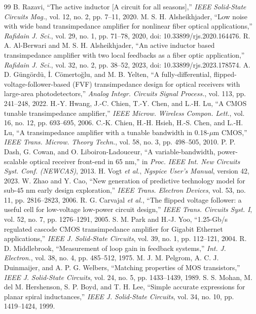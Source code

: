 \documentclass[11pt,a4paper]{article}
\begin{document}
\begin{thebibliography}{99}
 B. Razavi, ``The active inductor [A circuit for all seasons],'' \emph{IEEE Solid-State Circuits Mag.}, vol. 12, no. 2, pp. 7--11, 2020.
 M. S. H. Alsheikhjader, ``Low noise with wide band transimpedance amplifier for nonlinear fiber optical applications,'' \emph{Rafidain J. Sci.}, vol. 29, no. 1, pp. 71--78, 2020, doi: 10.33899/rjs.2020.164476.
 R. A. Al-Berwari and M. S. H. Alsheikhjader, ``An active inductor based transimpedance amplifier with two local feedbacks as a fiber optic application,'' \emph{Rafidain J. Sci.}, vol. 32, no. 2, pp. 38--52, 2023, doi: 10.33899/rjs.2023.178574.
 A. D. G\"ung\"ord\"u, \.I. C\"omerto\u{g}lu, and M. B. Yelten, ``A fully-differential, flipped-voltage-follower-based (FVF) transimpedance design for optical receivers with large-area photodetectors,'' \emph{Analog Integr. Circuits Signal Process.}, vol. 113, pp. 241--248, 2022.
 H.-Y. Hwang, J.-C. Chien, T.-Y. Chen, and L.-H. Lu, ``A CMOS tunable transimpedance amplifier,'' \emph{IEEE Microw. Wireless Compon. Lett.}, vol. 16, no. 12, pp. 693--695, 2006.
 C.-K. Chien, H.-H. Hsieh, H.-S. Chen, and L.-H. Lu, ``A transimpedance amplifier with a tunable bandwidth in 0.18-$\mu$m CMOS,'' \emph{IEEE Trans. Microw. Theory Techn.}, vol. 58, no. 3, pp. 498--505, 2010.
 P. P. Dash, G. Cowan, and O. Liboiron-Ladouceur, ``A variable-bandwidth, power-scalable optical receiver front-end in 65 nm,'' in \emph{Proc. IEEE Int. New Circuits Syst. Conf. (NEWCAS)}, 2013.
 H. Vogt \emph{et al.}, \emph{Ngspice User's Manual}, version 42, 2023.
 W. Zhao and Y. Cao, ``New generation of predictive technology model for sub-45 nm early design exploration,'' \emph{IEEE Trans. Electron Devices}, vol. 53, no. 11, pp. 2816--2823, 2006.
 R. G. Carvajal \emph{et al.}, ``The flipped voltage follower: a useful cell for low-voltage low-power circuit design,'' \emph{IEEE Trans. Circuits Syst. I}, vol. 52, no. 7, pp. 1276--1291, 2005.
 S. M. Park and H.-J. Yoo, ``1.25-Gb/s regulated cascode CMOS transimpedance amplifier for Gigabit Ethernet applications,'' \emph{IEEE J. Solid-State Circuits}, vol. 39, no. 1, pp. 112--121, 2004.
 R. D. Middlebrook, ``Measurement of loop gain in feedback systems,'' \emph{Int. J. Electron.}, vol. 38, no. 4, pp. 485--512, 1975.
 M. J. M. Pelgrom, A. C. J. Duinmaijer, and A. P. G. Welbers, ``Matching properties of MOS transistors,'' \emph{IEEE J. Solid-State Circuits}, vol. 24, no. 5, pp. 1433--1439, 1989.
 S. S. Mohan, M. del M. Hershenson, S. P. Boyd, and T. H. Lee, ``Simple accurate expressions for planar spiral inductances,'' \emph{IEEE J. Solid-State Circuits}, vol. 34, no. 10, pp. 1419--1424, 1999.
\end{thebibliography}
\end{document}
